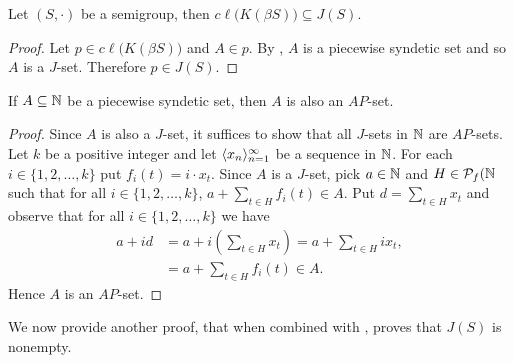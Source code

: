 \begin{cor}
  Let $(S, \cdot)$ be a semigroup, then $c\ell\bigl( K(\beta S) \bigr) \subseteq J(S)$.
\end{cor}
\begin{proof}
  Let $p \in c\ell\bigl( K(\beta S) \bigr)$ and $A \in p$.
  By \cite[Corollary 4.41]{Hindman:1998fk}, $A$ is a piecewise syndetic set and so $A$ is a $J$-set.
  Therefore $p \in J(S)$.
\end{proof}

\begin{cor}
  If $A \subseteq \mathbb{N}$ be a piecewise syndetic set, then $A$ is also an $AP$-set. 
\end{cor}
\begin{proof}
  Since $A$ is also a $J$-set, it suffices to show that all $J$-sets in $\mathbb{N}$ are $AP$-sets. 
  Let $k$ be a positive integer and let $\langle x_n \rangle_{n=1}^\infty$ be a sequence in $\mathbb{N}$. 
  For each $i \in \{1, 2, \ldots, k\}$ put $f_i(t) = i \cdot x_t$.
  Since $A$ is a $J$-set, pick $a \in \mathbb{N}$ and $H \in \mathcal{P}_f(\mathbb{N}$ such that for all $i \in \{1, 2, \ldots, k\}$, $a + \sum_{t \in H} f_i(t) \in A$. 
  Put $d = \sum_{t \in H} x_t$ and observe that for all $i \in \{1, 2, \ldots, k\}$ we have
  \begin{align*}
    a+id &= \textstyle a+ i(\sum_{t \in H} x_t) = a + \sum_{t \in H} ix_t, \\
    &= \textstyle a + \sum_{t \in H} f_i(t) \in A. 
  \end{align*}
  Hence $A$ is an $AP$-set.
\end{proof}

We now provide another proof, that when combined with \cite[Theorem 3.11]{Hindman:1998fk}, proves that $J(S)$ is nonempty.

